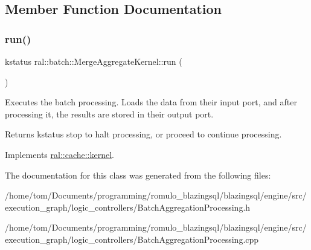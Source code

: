 \subsection{Member Function Documentation}
\mbox{\label{classral_1_1batch_1_1MergeAggregateKernel_aaab8112819acc0c2f17fc0e518cfe266}} 
\subsubsection{\texorpdfstring{run()}{run()}}
{\footnotesize\ttfamily kstatus ral\+::batch\+::\+Merge\+Aggregate\+Kernel\+::run (\begin{DoxyParamCaption}{ }\end{DoxyParamCaption})\hspace{0.3cm}{\ttfamily [virtual]}}



Executes the batch processing. Loads the data from their input port, and after processing it, the results are stored in their output port. 

\begin{DoxyReturn}{Returns}
kstatus \textquotesingle{}stop\textquotesingle{} to halt processing, or \textquotesingle{}proceed\textquotesingle{} to continue processing. 
\end{DoxyReturn}


Implements \hyperlink{classral_1_1cache_1_1kernel_a735b081cccae9574924e74ea6d293ef7}{ral\+::cache\+::kernel}.



The documentation for this class was generated from the following files\+:\begin{DoxyCompactItemize}
\item 
/home/tom/\+Documents/programming/romulo\+\_\+blazingsql/blazingsql/engine/src/execution\+\_\+graph/logic\+\_\+controllers/Batch\+Aggregation\+Processing.\+h\item 
/home/tom/\+Documents/programming/romulo\+\_\+blazingsql/blazingsql/engine/src/execution\+\_\+graph/logic\+\_\+controllers/Batch\+Aggregation\+Processing.\+cpp\end{DoxyCompactItemize}
